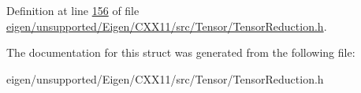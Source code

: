 Definition at line \hyperlink{eigen_2unsupported_2_eigen_2_c_x_x11_2src_2_tensor_2_tensor_reduction_8h_source_l00156}{156} of file \hyperlink{eigen_2unsupported_2_eigen_2_c_x_x11_2src_2_tensor_2_tensor_reduction_8h_source}{eigen/unsupported/\+Eigen/\+C\+X\+X11/src/\+Tensor/\+Tensor\+Reduction.\+h}.



The documentation for this struct was generated from the following file\+:\begin{DoxyCompactItemize}
\item 
eigen/unsupported/\+Eigen/\+C\+X\+X11/src/\+Tensor/\+Tensor\+Reduction.\+h\end{DoxyCompactItemize}
